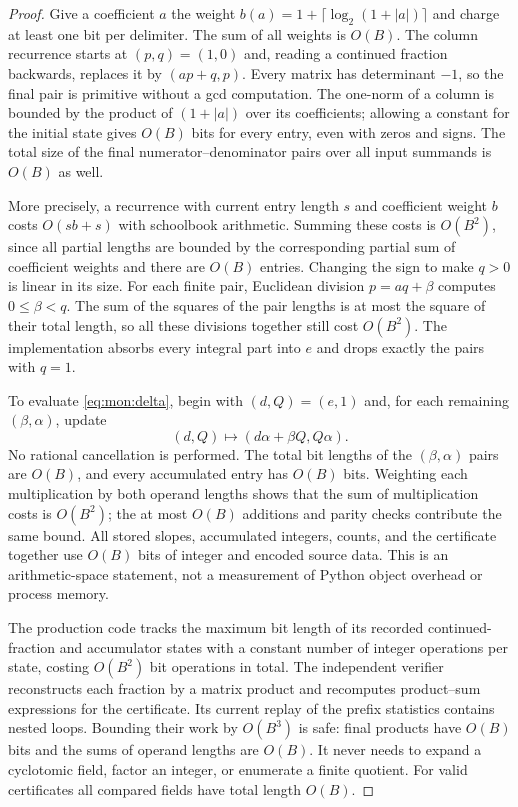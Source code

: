 \begin{proof}
Give a coefficient $a$ the weight
$b(a)=1+\lceil\log_2(1+|a|)\rceil$ and charge at least one bit per delimiter.
The sum of all weights is $O(B)$. The column recurrence starts at $(p,q)=(1,0)$
and, reading a continued fraction backwards, replaces it by
$(ap+q,p)$. Every matrix has determinant $-1$, so the final pair is primitive
without a gcd computation. The one-norm of a column is bounded by the
product of $(1+|a|)$ over its coefficients; allowing a constant for the
initial state gives $O(B)$ bits for every entry, even with zeros and signs.
The total size of the final numerator--denominator pairs over all input
summands is $O(B)$ as well.

More precisely, a recurrence with current entry length $s$ and coefficient
weight $b$ costs $O(sb+s)$ with schoolbook arithmetic. Summing these costs
is $O(B^2)$, since all partial lengths are bounded by the corresponding
partial sum of coefficient weights and there are $O(B)$ entries.
Changing the sign to make $q>0$ is linear in its size. For each finite pair,
Euclidean division $p=aq+\beta$ computes $0\le\beta<q$. The sum of the
squares of the pair lengths is at most the square of their total length,
so all these divisions together still cost $O(B^2)$. The implementation
absorbs every integral part into $e$ and drops exactly the pairs with $q=1$.

To evaluate \eqref{eq:mon:delta}, begin with $(d,Q)=(e,1)$ and, for each
remaining $(\beta,\alpha)$, update
\[
 (d,Q)\longmapsto(d\alpha+\beta Q,Q\alpha).
\]
No rational cancellation is performed. The total bit lengths of the
$(\beta,\alpha)$ pairs are $O(B)$, and every accumulated entry has
$O(B)$ bits. Weighting each multiplication by both operand lengths shows
that the sum of multiplication costs is $O(B^2)$; the at most $O(B)$
additions and parity checks contribute the same bound. All stored slopes,
accumulated integers, counts, and the certificate together use $O(B)$ bits
of integer and encoded source data. This is an arithmetic-space statement,
not a measurement of Python object overhead or process memory.

The production code tracks the maximum bit length of its recorded
continued-fraction and accumulator states with a constant number of integer
operations per state, costing $O(B^2)$ bit operations in total.
The independent verifier reconstructs each fraction by a matrix product and
recomputes product--sum expressions for the certificate. Its current replay
of the prefix statistics contains nested loops. Bounding their work by
$O(B^3)$ is safe: final products have $O(B)$ bits and the sums of operand
lengths are $O(B)$. It never needs to expand a cyclotomic field, factor an
integer, or enumerate a finite quotient. For valid certificates all compared
fields have total length $O(B)$.
\end{proof}

